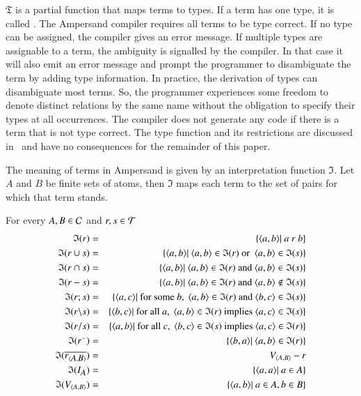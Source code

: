\documentclass{elsarticle}
\begin{document}
	$\mathfrak{T}$ is a partial function that maps terms to types.
	If a term has one type, it is called .
	The Ampersand compiler requires all terms to be type correct.
	If no type can be assigned, the compiler gives an error message.
	If multiple types are assignable to a term, the ambiguity is signalled by the compiler.
	In that case it will also emit an error message and prompt the programmer to disambiguate the term by adding type information.
	In practice, the derivation of types can disambiguate most terms.
	So, the programmer experiences some freedom to denote distinct relations by the same name without the obligation to specify their types at all occurrences.
	The compiler does not generate any code if there is a term that is not type correct.
	The type function and its restrictions are discussed in~\cite{Joosten2015}
	and have no consequences for the remainder of this paper.

 	The meaning of terms in Ampersand is given by an interpretation function $\mathfrak{I}$.
	Let $A$ and $B$ be finite sets of atoms, then $\mathfrak{I}$ maps each term to the set of pairs for which that term stands.
\begin{definition}
\label{interpretation of terms}
\item   For every $A,B\in\mathcal{C}$ and $r,s\in\mathcal{T}$
\begin{eqnarray}
	\mathfrak{I}(r)		 &=&\{\langle{a},{b}\rangle|\ a\ r\ b\}	\\
	\mathfrak{I}(r \cup s)	 &=&\{\langle{a},{b}\rangle|\ \langle{a},{b}\rangle\in\mathfrak{I}(r)\ \text{or }\ \langle{a},{b}\rangle\in\mathfrak{I}(s)\}	\\
	\mathfrak{I}(r \cap s)	 &=&\{\langle{a},{b}\rangle|\ \langle{a},{b}\rangle\in\mathfrak{I}(r)\ \text{and}\ \langle{a},{b}\rangle\in\mathfrak{I}(s)\}	\\
	\mathfrak{I}(r-s)	 &=&\{\langle{a},{b}\rangle|\ \langle{a},{b}\rangle\in\mathfrak{I}(r)\ \text{and}\ \langle{a},{b}\rangle\notin\mathfrak{I}(s)\}	\\
	\mathfrak{I}(r;s)	 &=&\{\langle{a},{c}\rangle|\ \text{for some}\ b,\ \langle{a},{b}\rangle\in\mathfrak{I}(r)\ \text{and}\ \langle{b},{c}\rangle\in\mathfrak{I}(s)\}	\\
	\mathfrak{I}(r\backslash s)	 &=&\{\langle{b},{c}\rangle|\ \text{for all}\ a,\ \langle{a},{b}\rangle\in\mathfrak{I}(r)\ \text{implies}\ \langle{a},{c}\rangle\in\mathfrak{I}(s)\}	\\
	\mathfrak{I}(r\slash s)	 &=&\{\langle{a},{b}\rangle|\ \text{for all}\ c,\ \langle{b},{c}\rangle\in\mathfrak{I}(s)\ \text{implies}\ \langle{a},{c}\rangle\in\mathfrak{I}(r)\}	\\
	\mathfrak{I}({r}^\smallsmile)	 &=&\{\langle{b},{a}\rangle|\ \langle{a},{b}\rangle\in\mathfrak{I}(r)    \}	\\
	\mathfrak{I}(\overline{\text{\em r\/}_{\langle{\text{\em \small A\/}},{\text{\em \small B\/}}\rangle}})	 &=&V_{\langle{A},{B}\rangle}-r	\\
	\mathfrak{I}(I_{\text{\em \small A\/}}) 	 &=&\{\langle{a},{a}\rangle|\ a\in A\}	\\
	\mathfrak{I}(V_{\langle{A},{B}\rangle})&=&\{\langle{a},{b}\rangle|\ a\in A, b\in B\}
\end{eqnarray}
\end{definition}
\end{document}
